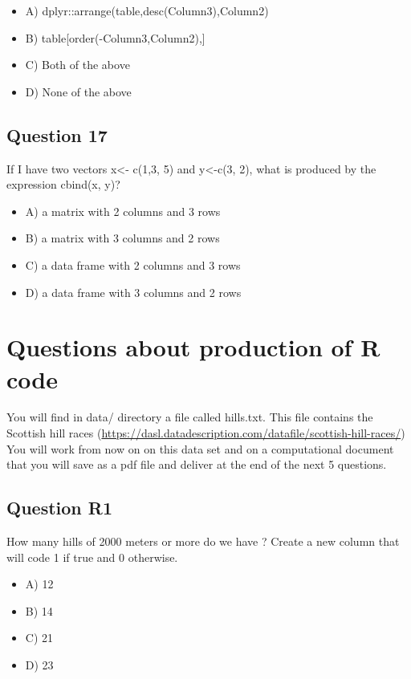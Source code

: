 \documentclass[11pt]{article}
\begin{document}
\begin{itemize}
\item A) dplyr::arrange(table,desc(Column3),Column2)

\item B) table[order(-Column3,Column2),]

\item C) Both of the above

\item D) None of the above
\end{itemize}

\subsection*{Question 17}
\label{sec:orgdebc896}
If I have two vectors x<- c(1,3, 5) and y<-c(3, 2), what is produced by the expression cbind(x, y)?

\begin{itemize}
\item A) a matrix with 2 columns and 3 rows

\item B) a matrix with 3 columns and 2 rows

\item C) a data frame with 2 columns and 3 rows

\item D) a data frame with 3 columns and 2 rows
\end{itemize}

\section*{Questions about production of R code}
\label{sec:org0189a17}
You will find in data/ directory a file called hills.txt.  This file contains
the Scottish hill races
(\url{https://dasl.datadescription.com/datafile/scottish-hill-races/}) You will work
from now on on this data set and on a computational document that you will save
as a pdf file and deliver at the end of the next 5 questions.

\subsection*{Question R1}
\label{sec:orgd01fe07}
How many hills of 2000 meters or more do we have ?
Create a new column that will code 1 if true and 0 otherwise. 
\begin{itemize}
\item A) 12

\item B) 14

\item C) 21

\item D) 23
\end{itemize}
\end{document}
